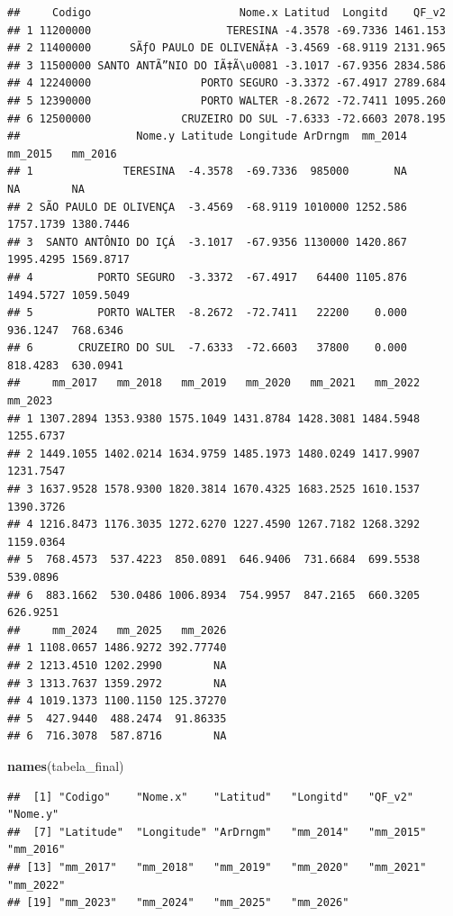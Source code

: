 \documentclass[
]{article}
\newenvironment{Shaded}{\begin{snugshade}}{\end{snugshade}}
\newcommand{\FunctionTok}[1]{\textcolor[rgb]{0.13,0.29,0.53}{\textbf{#1}}}
\newcommand{\NormalTok}[1]{#1}
\begin{document}
\begin{verbatim}
##     Codigo                       Nome.x Latitud  Longitd    QF_v2
## 1 11200000                     TERESINA -4.3578 -69.7336 1461.153
## 2 11400000      SÃƒO PAULO DE OLIVENÃ‡A -3.4569 -68.9119 2131.965
## 3 11500000 SANTO ANTÃ”NIO DO IÃ‡Ã\u0081 -3.1017 -67.9356 2834.586
## 4 12240000                 PORTO SEGURO -3.3372 -67.4917 2789.684
## 5 12390000                 PORTO WALTER -8.2672 -72.7411 1095.260
## 6 12500000              CRUZEIRO DO SUL -7.6333 -72.6603 2078.195
##                  Nome.y Latitude Longitude ArDrngm  mm_2014   mm_2015   mm_2016
## 1              TERESINA  -4.3578  -69.7336  985000       NA        NA        NA
## 2 SÃO PAULO DE OLIVENÇA  -3.4569  -68.9119 1010000 1252.586 1757.1739 1380.7446
## 3  SANTO ANTÔNIO DO IÇÁ  -3.1017  -67.9356 1130000 1420.867 1995.4295 1569.8717
## 4          PORTO SEGURO  -3.3372  -67.4917   64400 1105.876 1494.5727 1059.5049
## 5          PORTO WALTER  -8.2672  -72.7411   22200    0.000  936.1247  768.6346
## 6       CRUZEIRO DO SUL  -7.6333  -72.6603   37800    0.000  818.4283  630.0941
##     mm_2017   mm_2018   mm_2019   mm_2020   mm_2021   mm_2022   mm_2023
## 1 1307.2894 1353.9380 1575.1049 1431.8784 1428.3081 1484.5948 1255.6737
## 2 1449.1055 1402.0214 1634.9759 1485.1973 1480.0249 1417.9907 1231.7547
## 3 1637.9528 1578.9300 1820.3814 1670.4325 1683.2525 1610.1537 1390.3726
## 4 1216.8473 1176.3035 1272.6270 1227.4590 1267.7182 1268.3292 1159.0364
## 5  768.4573  537.4223  850.0891  646.9406  731.6684  699.5538  539.0896
## 6  883.1662  530.0486 1006.8934  754.9957  847.2165  660.3205  626.9251
##     mm_2024   mm_2025   mm_2026
## 1 1108.0657 1486.9272 392.77740
## 2 1213.4510 1202.2990        NA
## 3 1313.7637 1359.2972        NA
## 4 1019.1373 1100.1150 125.37270
## 5  427.9440  488.2474  91.86335
## 6  716.3078  587.8716        NA
\end{verbatim}

\begin{Shaded}
\begin{Highlighting}[]
\FunctionTok{names}\NormalTok{(tabela\_final)}
\end{Highlighting}
\end{Shaded}

\begin{verbatim}
##  [1] "Codigo"    "Nome.x"    "Latitud"   "Longitd"   "QF_v2"     "Nome.y"   
##  [7] "Latitude"  "Longitude" "ArDrngm"   "mm_2014"   "mm_2015"   "mm_2016"  
## [13] "mm_2017"   "mm_2018"   "mm_2019"   "mm_2020"   "mm_2021"   "mm_2022"  
## [19] "mm_2023"   "mm_2024"   "mm_2025"   "mm_2026"
\end{verbatim}
\end{document}
